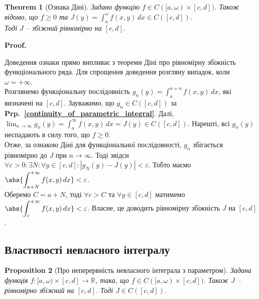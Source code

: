 \documentclass[a4paper, 10pt]{article}
\makeatletter
\def\huge{\displaystyle}
\def\qed{$\blacksquare$}
\theoremstyle{theoremdd}
\newtheorem{theorem}{Theorem}[subsection]
\theoremstyle{theoremdd}
\theoremstyle{theoremdd}
\theoremstyle{theoremdd}
\theoremstyle{theoremdd}
\theoremstyle{theoremdd}
\newtheorem{proposition}[theorem]{Proposition}
\theoremstyle{theoremdd}
\theoremstyle{theoremdd}
\theoremstyle{theoremdd}
\newcommand\prpref[1]{\textbf{Prp.~\ref{#1}}}
\renewenvironment{proof}[1][Proof.\\]{\par
\pushQED{\hfill \qed}%
\normalfont \topsep6\p@\@plus6\p@\relax
\trivlist
\item\relax
{\bfseries
#1\@addpunct{.}}\hspace\labelsep\ignorespaces
}{%
\popQED\endtrivlist\@endpefalse
}
\makeatother
\begin{document}
\begin{theorem}[Ознака Діні]
Задано функцію $f \in C([a,\omega) \times [c,d])$. Також відомо, що $f \geq 0$ та $J(y) = \huge\int_a^\omega f(x,y)\,dx \in C([c,d])$.\\
Тоді $J$ -- збіжний рівномірно на $[c,d]$.
\end{theorem}

\begin{proof}
Доведення ознаки прямо випливає з теореми Діні про рівномірну збіжність функціонального ряда. Для спрощення доведення розгляну випадок, коли $\omega = +\infty$.\\
Розглянемо функціональну послідовність $g_n(y) = \displaystyle\int_a^{a+n} f(x,y)\,dx$, які визначені на $[c,d]$. Зауважимо, що $g_n \in C([c,d])$ за \prpref{continuity_of_parametric_integral}. Далі, $\displaystyle\lim_{n \to \infty} g_n(y) = \int_a^\infty f(x,y)\,dx = J(y) \in C([c,d])$. Нарешті, всі $g_n(y)$ неспадають в силу того, що $f \geq 0$.\\
Отже, за ознакою Діні для функціональної послідовності, $g_n$ збігається рівномірно до $J$ при $n \to \infty$. Тоді звідси $\forall \varepsilon > 0: \exists N: \forall y \in [c,d]: |g_N(y) - J(y)| < \varepsilon$. Тобто маємо $\displaystyle\abs{\int_{a+N}^{+\infty} f(x,y)\,dx} < \varepsilon$.\\
Оберемо $C = a+N$, тоді $\forall c > C$ та $\forall y \in [c,d]$ матимемо $\displaystyle\abs{\int_c^{+\infty} f(x,y)\,dx} < \varepsilon$. Власне, це доводить рівномірну збіжність $J$ на $[c,d]$.
\end{proof}

\subsection{Властивості невласного інтегралу}
\begin{proposition}[Про неперервність невласного інтеграла з параметром]
Задана функція $f \colon [a,\omega) \times [c,d] \to \mathbb{R}$, така, що $f \in C([a,\omega) \times [c,d])$. Також $J$ -- рівномірно збіжний на $[c,d]$. Тоді $J \in C([c,d])$.
\end{proposition}
\end{document}
